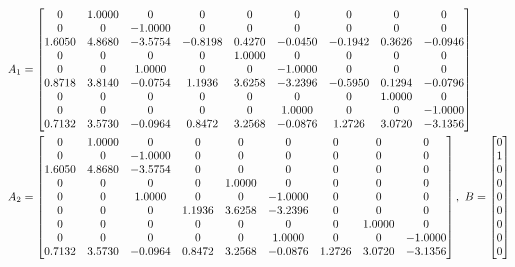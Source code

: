 {\scriptsize
\begin{align*}
& A_1 = \left[\begin{matrix}
0  &  1.0000   &      0   &      0    &     0    &     0     &    0     &    0    &     0\\
         0    &     0  & -1.0000   &      0    &     0   &      0   &      0   &      0   &      0\\
    1.6050 &   4.8680 &  -3.5754 &  -0.8198  &  0.4270 &  -0.0450 &  -0.1942  &  0.3626  & -0.0946\\
         0   &      0     &    0    &     0  &  1.0000    &     0   &      0   &      0    &     0\\
         0   &      0 &   1.0000    &     0    &     0  & -1.0000   &      0    &     0    &     0\\
    0.8718  &  3.8140 &  -0.0754  &  1.1936 &   3.6258  & -3.2396  & -0.5950 &   0.1294 &  -0.0796\\
         0    &     0    &     0   &      0   &      0    &     0   &      0 &   1.0000   &      0\\
         0    &     0    &     0    &     0    &     0  &  1.0000      &   0    &     0  & -1.0000\\
    0.7132  &  3.5730 &  -0.0964  &  0.8472  &  3.2568 &  -0.0876  &  1.2726  &  3.0720 &  -3.1356
\end{matrix}\right]\\
& A_2 = \left[\begin{matrix}
 0   & 1.0000   &      0    &     0     &    0  &       0   &      0      &   0     &    0\\
         0    &     0  & -1.0000    &     0   &      0     &    0    &     0   &      0  &       0\\
    1.6050  &  4.8680  & -3.5754    &     0     &    0     &    0  &       0     &    0    &     0\\
         0   &      0   &      0    &     0   & 1.0000     &    0     &    0    &     0   &      0\\
         0  &       0  &  1.0000      &   0    &     0  & -1.0000   &      0  &       0  &       0\\
         0  &       0   &      0  &  1.1936  &  3.6258  & -3.2396   &      0     &    0   &      0\\
         0  &       0    &     0     &    0   &      0     &    0    &     0  &  1.0000    &     0\\
         0   &      0    &     0    &     0     &    0  &  1.0000    &     0      &   0 &  -1.0000\\
    0.7132 &   3.5730  & -0.0964 &   0.8472  &  3.2568 &  -0.0876 &   1.2726  &  3.0720  & -3.1356
\end{matrix}\right],~B = \left[\begin{matrix}
 0\\
     1\\
     0\\
     0\\
     0\\
     0\\
     0\\
     0\\
     0
\end{matrix}\right]
\end{align*}
}

